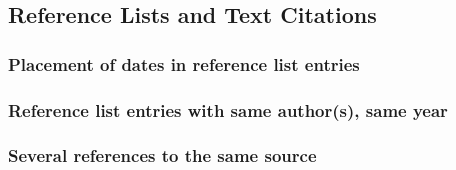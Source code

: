 \documentclass[11pt,letterpaper,oneside]{article}
\begin{document}
\begin{citeref}
\item \parencite[87--88]{strayed2012}
\item \parencite[32]{daum2015}
\item \parencite[188]{grazer2015}
\item \parencite[242--55]{garcia1988}
\item \parencite[310]{gould1984a}
\item \parencite[484--85]{bagley2015}
\item \parencite[312]{liu2015}
\end{citeref}

\setcounter{subsection}{1}
\subsection{Reference Lists and Text Citations}
\setcounter{subsection}{15}

\setcounter{subsubsection}{13}
\subsubsection{Placement of dates in reference list entries}

\begin{citeref}
\item \parencite{pager2015}
\item \parencite{unger2014}
\end{citeref}

\setcounter{subsubsection}{19}
\subsubsection{Reference list entries with same author(s), same year}

\begin{citeref}
\item \parencite[218]{fogel2004b}
\item \parencite[45--46]{fogel2004a}
\end{citeref}

\setcounter{subsubsection}{26}
\subsubsection{Several references to the same source}
\end{document}
